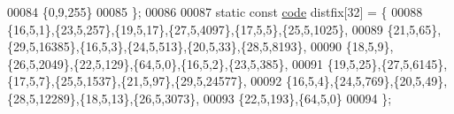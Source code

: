 \begin{DoxyCode}
00084         \{0,9,255\}
00085     \};
00086 
00087     \textcolor{keyword}{static} \textcolor{keyword}{const} \hyperlink{structcode}{code} distfix[32] = \{
00088         \{16,5,1\},\{23,5,257\},\{19,5,17\},\{27,5,4097\},\{17,5,5\},\{25,5,1025\},
00089         \{21,5,65\},\{29,5,16385\},\{16,5,3\},\{24,5,513\},\{20,5,33\},\{28,5,8193\},
00090         \{18,5,9\},\{26,5,2049\},\{22,5,129\},\{64,5,0\},\{16,5,2\},\{23,5,385\},
00091         \{19,5,25\},\{27,5,6145\},\{17,5,7\},\{25,5,1537\},\{21,5,97\},\{29,5,24577\},
00092         \{16,5,4\},\{24,5,769\},\{20,5,49\},\{28,5,12289\},\{18,5,13\},\{26,5,3073\},
00093         \{22,5,193\},\{64,5,0\}
00094     \};
\end{DoxyCode}
